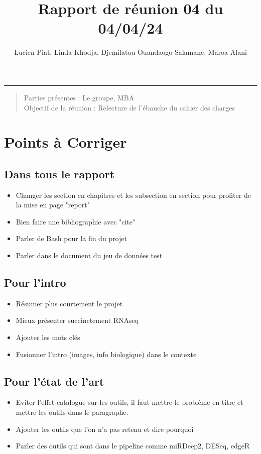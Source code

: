 \documentclass[a4paper, 11pt]{article}
\title{Rapport de réunion 04 du 04/04/24}
\author{Lucien Piat, Linda Khodja, Djemilatou Ouandaogo Salamane, Maroa Alani}
\begin{document}
\maketitle
\noindent\rule{8cm}{0.4pt}
\begin{quote}
    Parties présentes : Le groupe, MBA \\
    Objectif de la réunion : Relecture de l'ébauche du cahier des charges
\end{quote}

\section{Points à Corriger}
\subsection{Dans tous le rapport}
\begin{itemize}
    \item Changer les section en chapitres et les subsection en section pour profiter de la mise en page "report"
    \item Bien faire une bibliographie avec "cite"
    \item Parler de Bash pour la fin du projet
    \item Parler dans le document du jeu de données test
\end{itemize}

\subsection{Pour l'intro}
\begin{itemize}
    \item Résumer plus courtement le projet
    \item Mieux présenter succinctement RNAseq
    \item Ajouter les mots clés
    \item Fusionner l'intro (images, info biologique) dans le contexte
\end{itemize}

\subsection{Pour l'état de l'art}
\begin{itemize}
    \item Eviter l'effet catalogue sur les outils, il faut mettre le problème en titre et mettre les outils dans le paragraphe.  
    \item Ajouter les outils que l'on n'a pas retenu et dire pourquoi
    \item Parler des outils qui sont dans le pipeline comme miRDeep2, DESeq, edgeR
\end{itemize}
\end{document}
